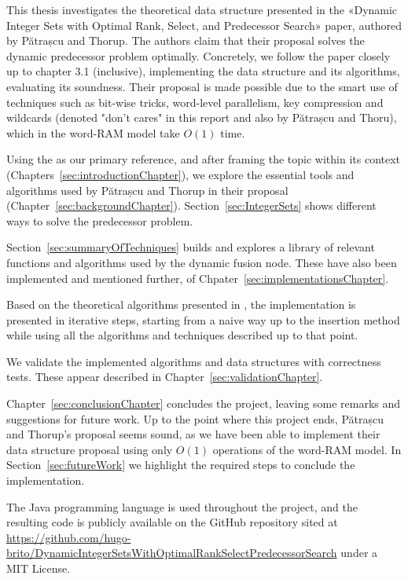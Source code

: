 
This thesis investigates the theoretical data structure presented in the «Dynamic Integer Sets with Optimal Rank, Select, and Predecessor Search» paper, authored by Pătrașcu and Thorup.
The authors claim that their proposal solves the dynamic predecessor problem optimally. Concretely, we follow the paper closely up to chapter 3.1 (inclusive), implementing the data structure and its algorithms, evaluating its soundness.
Their proposal is made possible due to the smart use of techniques such as bit-wise tricks, word-level parallelism, key compression and wildcards (denoted "don't cares" in this report and also by Pătrașcu and Thoru), which in the word-RAM model take $O(1)$ time.

Using the \cite{patrascu2014dynamic} as our primary reference, and after framing the topic within its context (Chapters~\ref{sec:introductionChapter}), we explore the essential tools and algorithms used by Pătrașcu and Thorup in their proposal (Chapter~\ref{sec:backgroundChapter}).
Section~\ref{sec:IntegerSets} shows different ways to solve the predecessor problem.

Section~\ref{sec:summaryOfTechniques} builds and explores a library of relevant functions and algorithms used by the dynamic fusion node. These have also been implemented and mentioned further, of Chpater~\ref{sec:implementationsChapter}.

Based on the theoretical algorithms presented in \cite{patrascu2014dynamic}, the implementation is presented in iterative steps, starting from a naive way up to the insertion method while using all the algorithms and techniques described up to that point.

We validate the implemented algorithms and data structures with correctness tests. These appear described in Chapter~\ref{sec:validationChapter}.

Chapter~\ref{sec:conclusionChapter} concludes the project, leaving some remarks and suggestions for future work.
Up to the point where this project ends, Pătrașcu and Thorup's proposal seems sound, as we have been able to implement their data structure proposal using only $O(1)$ operations of the word-RAM model. In Section~\ref{sec:futureWork} we highlight the required steps to conclude the implementation.

The Java programming language is used throughout the project, and the resulting code is publicly available on the GitHub repository sited at \url{https://github.com/hugo-brito/DynamicIntegerSetsWithOptimalRankSelectPredecessorSearch} under a MIT License.

